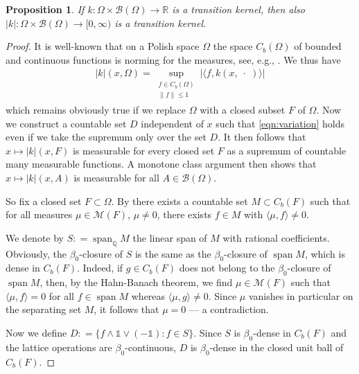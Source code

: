 \documentclass{amsart}
\numberwithin{equation}{section}
\newtheorem{prop}[thm]{Proposition}
\theoremstyle{remark}
\theoremstyle{definition}
\begin{document}
\begin{prop}
\label{prop:abskernel}
	If $k : \Omega\times \mathscr{B}(\Omega) \to {\mathds{R}}$ is a transition kernel, then also $\lvert k\rvert : \Omega \times \mathscr{B}(\Omega) \to [0,\infty)$
	is a transition kernel. 
\end{prop}

\begin{proof}
  It is well-known that on a Polish space $\Omega$ the space $C_b(\Omega)$ of bounded and continuous functions is norming 
  for the measures, see, e.g., \cite[Example 2.4]{kunze2011}.
  We thus have
     \begin{align}
		\label{eqn:variation}
		\lvert k\rvert (x,\Omega) = \sup_{\substack{f\in C_b(\Omega)\\\lVert f\rVert\leq 1}} \lvert {\langle {f},{k(x,\;\cdot\;)}\rangle}\rvert
	 \end{align}
	which remains obviously true if we replace $\Omega$ with a closed subset $F$ of $\Omega$.
	Now we construct a countable set $D$ independent of $x$ such that \eqref{eqn:variation} holds even if we take
	the supremum only over the set $D$. It then follows
	that $x \mapsto |k|(x,F)$ is measurable for every closed set $F$ as a supremum of countable many measurable functions.
	A monotone class argument 
	then shows that $x \mapsto |k|(x,A)$ is measurable for all $A \in \mathscr{B}(\Omega)$.

	So fix a closed set $F \subset \Omega$. By \cite[Thm 6.3]{kunze2011} 
	there exists a countable set $M \subset C_b(F)$ such that
	for all measures $\mu\in \mathscr{M}(F)$, $\mu\neq 0$, there exists $f \in M$ with ${\langle {\mu},{f}\rangle} \neq 0$.
	
	We denote by $S {\mathrel{\mathop:}=} \operatorname{span}_{\mathds{Q}} M$ the linear span of $M$ with rational coefficients. Obviously, 
	the $\beta_0$-closure of $S$ is the same as the $\beta_0$-closure of $\operatorname{span} M$, which is dense in $C_b(F)$.
	Indeed, if $g\in C_b(F)$ does not belong to the $\beta_0$-closure of $\operatorname{span} M$, then, by the Hahn-Banach theorem,
    we find
	$\mu \in \mathscr{M}(F)$ such that ${\langle {\mu},{f}\rangle}=0$ for all $f\in \operatorname{span} M$ whereas ${\langle {\mu},{g}\rangle}\neq 0$.
	Since $\mu$ vanishes in particular on the separating set $M$, 
	it follows that $\mu=0$ --- a contradiction.

	Now we define $D {\mathrel{\mathop:}=} \{ f\wedge \mathds{1} \vee (-\mathds{1}) : f \in S\}$. Since $S$ is $\beta_0$-dense in
	 $C_b(F)$ and the lattice operations are $\beta_0$-continuous, $D$ is $\beta_0$-dense in the closed unit ball 
	 of $C_b(F)$.


\end{proof}
\end{document}
